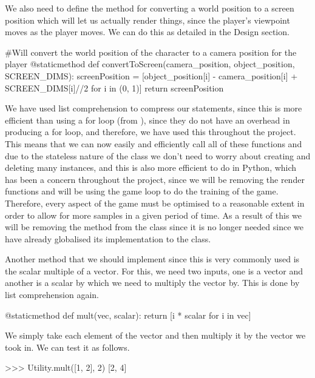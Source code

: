 \vs
We also need to define the method for converting a world position to a screen position which will let us actually render things, since the player's viewpoint moves as the player moves. We can do this as detailed in the Design section.

\begin{mpy}
    #Will convert the world position of the character to a camera position for the player
    @staticmethod
    def convertToScreen(camera_position, object_position, SCREEN_DIMS):
        screenPosition = [object_position[i] - camera_position[i] + SCREEN_DIMS[i]//2 for i in (0, 1)]
        return screenPosition
\end{mpy}

\vs
We have used list comprehension to compress our statements, since this is more efficient than using a for loop (from \cite{listcomp}), since they do not have an overhead in producing a for loop, and therefore, we have used this throughout the project. This means that we can now easily and efficiently call all of these functions and due to the stateless nature of the  class we don't need to worry about creating and deleting many instances, and this is also more efficient to do in Python, which has been a concern throughout the project, since we will be removing the render functions and will be using the game loop to do the training of the game. Therefore, every aspect of the game must be optimised to a reasonable extent in order to allow for more samples in a given period of time. As a result of this we will be removing the  method from the  class since it is no longer needed since we have already globalised its implementation to the  class.

Another method that we should implement since this is very commonly used is the scalar multiple of a vector. For this, we need two inputs, one is a vector and another is a scalar by which we need to multiply the vector by. This is done by list comprehension again.

\begin{mpy}
    @staticmethod
    def mult(vec, scalar):
        return [i * scalar for i in vec]
\end{mpy}

We simply take each element of the vector and then multiply it by the vector we took in. We can test it as follows.

\begin{mpy}
>>> Utility.mult([1, 2], 2)
[2, 4]
\end{mpy}

